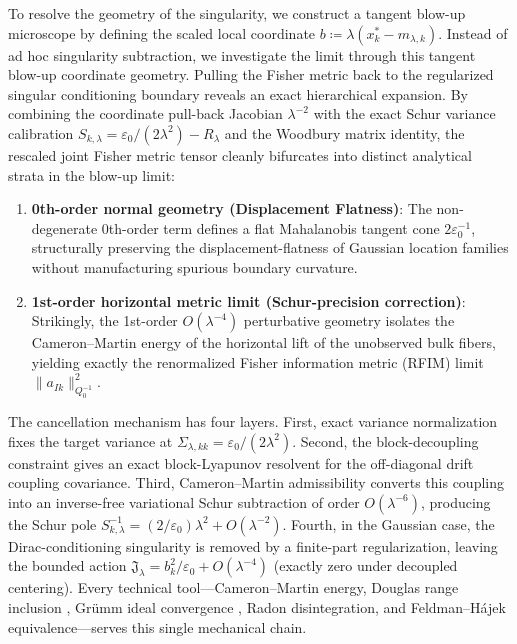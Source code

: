 \documentclass[11pt]{amsart}
\theoremstyle{plain}
\theoremstyle{definition}
\theoremstyle{remark}
\begin{document}
To resolve the geometry of the singularity, we construct a tangent blow-up microscope by defining the scaled local coordinate $b \coloneqq \lambda(x_k^* - m_{\lambda,k})$. Instead of ad hoc singularity subtraction, we investigate the limit through this tangent blow-up coordinate geometry. Pulling the Fisher metric back to the regularized singular conditioning boundary reveals an exact hierarchical expansion. By combining the coordinate pull-back Jacobian $\lambda^{-2}$ with the exact Schur variance calibration $S_{k,\lambda} = \varepsilon_0/(2\lambda^2) - R_\lambda$ and the Woodbury matrix identity, the rescaled joint Fisher metric tensor cleanly bifurcates into distinct analytical strata in the blow-up limit:
\begin{enumerate}
\item \textbf{0th-order normal geometry (Displacement Flatness)}: The non-degenerate 0th-order term defines a flat Mahalanobis tangent cone $2\varepsilon_0^{-1}$, structurally preserving the displacement-flatness of Gaussian location families without manufacturing spurious boundary curvature.
\item \textbf{1st-order horizontal metric limit (Schur-precision correction)}: Strikingly, the 1st-order $O(\lambda^{-4})$ perturbative geometry isolates the Cameron--Martin energy of the horizontal lift of the unobserved bulk fibers, yielding exactly the renormalized Fisher information metric (RFIM) limit $\|a_{Ik}\|_{Q_0^{-1}}^2$.
\end{enumerate}

The cancellation mechanism has four layers. First, exact variance normalization fixes the target variance at $\Sigma_{\lambda,kk}=\varepsilon_0/(2\lambda^2)$. Second, the block-decoupling constraint gives an exact block-Lyapunov resolvent for the off-diagonal drift coupling covariance. Third, Cameron--Martin admissibility converts this coupling into an inverse-free variational Schur subtraction of order $O(\lambda^{-6})$, producing the Schur pole $S_{k,\lambda}^{-1}=(2/\varepsilon_0)\lambda^2+O(\lambda^{-2})$. Fourth, in the Gaussian case, the Dirac-conditioning singularity is removed by a finite-part regularization, leaving the bounded action $\mathfrak{J}_\lambda=b_k^2/\varepsilon_0+O(\lambda^{-4})$ (exactly zero under decoupled centering). Every technical tool---Cameron--Martin energy, Douglas range inclusion \cite{douglas1966majorization}, Gr\"umm ideal convergence \cite{simon2005trace}, Radon disintegration, and Feldman--H\'{a}jek equivalence---serves this single mechanical chain.
\end{document}
